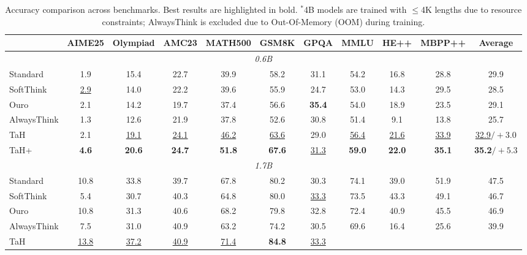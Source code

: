 \begin{table}[t]
    \caption{Accuracy comparison across benchmarks.
    Best results are highlighted in bold. $^*$4B models are trained with $\leq$4K lengths due to resource constraints; AlwaysThink is excluded due to Out-Of-Memory (OOM) during training.}
    \label{tab:performance_by_category_transposed}
    \centering
    \setlength\tabcolsep{4pt} %
    \begin{tabular}{lcccccccccc}
    \toprule
    ~ &
    AIME25 & Olympiad & AMC23 & MATH500 & GSM8K & GPQA & MMLU & HE++ & MBPP++ & Average \\
    \midrule
    \multicolumn{11}{c}{\textit{0.6B}} \\
    \midrule
    Standard &
    1.9 & 15.4 & 22.7 & 39.9 & 58.2 & 31.1 & 54.2 & 16.8 & 28.8 & 29.9 \\
    SoftThink &
    \underline{2.9} & 14.0 & 22.2 & 39.6 & 55.9 & 24.7 & 53.0 & 14.3 & 29.5 & 28.5 \\
    Ouro &
    2.1 & 14.2 & 19.7 & 37.4 & 56.6 & \textbf{35.4} & 54.0 & 18.9 & 23.5 & 29.1 \\
    AlwaysThink &
    1.3 & 12.6 & 21.9 & 37.8 & 52.6 & 30.8 & 51.4 & 9.1 & 13.8 & 25.7 \\
    \rowcolor{tahgray}
    TaH &
    2.1 & \underline{19.1} & \underline{24.1} & \underline{46.2} &
    \underline{63.6} & 29.0 & \underline{56.4} & \underline{21.6} & \underline{33.9} & \underline{32.9}{\scriptsize$/+3.0$} \\
    \rowcolor{tahgray}
    TaH+ &
    \textbf{4.6} & \textbf{20.6} & \textbf{24.7} & \textbf{51.8} &
    \textbf{67.6} & \underline{31.3} & \textbf{59.0} & \textbf{22.0} & \textbf{35.1} & \textbf{35.2}{\scriptsize$/+5.3$} \\
    \midrule
    \multicolumn{11}{c}{\textit{1.7B}} \\
    \midrule
    Standard &
    10.8 & 33.8 & 39.7 & 67.8 & 80.2 & 30.3 & 74.1 & 39.0 & 51.9 & 47.5 \\
    SoftThink &
    5.4 & 30.7 & 40.3 & 64.8 & 80.0 & \underline{33.3} & 73.5 & 43.3 & 49.1 & 46.7 \\
    Ouro &
    10.8 & 31.3 & 40.6 & 68.2 & 79.8 & 32.8 & 72.4 & 40.9 & 45.5 & 46.9 \\
    AlwaysThink &
    7.5 & 31.0 & 40.9 & 63.2 & 74.2 & 30.5 & 69.6 & 16.4 & 25.6 & 39.9 \\
    \rowcolor{tahgray}
    TaH &
    \underline{13.8} & \underline{37.2} & \underline{40.9} &
    \underline{71.4} & \textbf{84.8} & \underline{33.3} &

\end{tabular}
\end{table}
